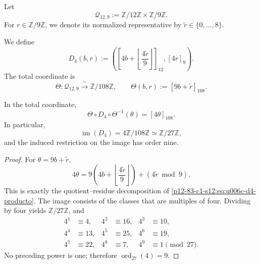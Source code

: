 Let
\[
 \mathcal Q_{12,9}:=
 \mathbb Z/12\mathbb Z\times\mathbb Z/9\mathbb Z.
\]
For \(r\in\mathbb Z/9\mathbb Z\), we denote its normalized representative by
\(\widetilde r\in\{0,\ldots,8\}\).

\begin{definition}
\label{p12-83-c1-s12:def:u006c-dilatacion-registro}
We define
\begin{equation}
 D_4(b,r):=
 \left(
 \left[
  4b+\left\lfloor\frac{4\widetilde r}{9}\right\rfloor
 \right]_{12},
 [4r]_9
 \right).
 \label{p12-83-c1-s12:eq:u006c-d4-producto}
\end{equation}
The total coordinate is
\begin{equation}
 \Theta:\mathcal Q_{12,9}\xrightarrow{\;\sim\;}
 \mathbb Z/108\mathbb Z,
 \qquad
 \Theta(b,r):=[9b+\widetilde r]_{108}.
 \label{p12-83-c1-s12:eq:u006c-coordenada-total}
\end{equation}
\end{definition}

\begin{proposition}
\label{p12-83-c1-s12:prop:u006c-d4-total}
In the total coordinate,
\begin{equation}
 \boxed{
 \Theta\circ D_4\circ\Theta^{-1}(\theta)=[4\theta]_{108}.}
 \label{p12-83-c1-s12:eq:u006c-d4-total}
\end{equation}
In particular,
\begin{equation}
 \operatorname{im}(D_4)
 =4\mathbb Z/108\mathbb Z
 \simeq\mathbb Z/27\mathbb Z,
 \label{p12-83-c1-s12:eq:u006c-imagen-d4}
\end{equation}
and the induced restriction on the image has order nine.
\end{proposition}

\begin{proof}
For \(\theta=9b+\widetilde r\),
\[
 4\theta
 =9\left(
  4b+\left\lfloor\frac{4\widetilde r}{9}\right\rfloor
 \right)
 +(4\widetilde r\bmod9).
\]
This is exactly the quotient--residue decomposition of
\eqref{p12-83-c1-s12:eq:u006c-d4-producto}. The image consists of the classes that are
multiples of four. Dividing by four yields
\(\mathbb Z/27\mathbb Z\), and
\[
\begin{aligned}
 4^1&\equiv4,& 4^2&\equiv16,& 4^3&\equiv10,\\
 4^4&\equiv13,& 4^5&\equiv25,& 4^6&\equiv19,\\
 4^7&\equiv22,& 4^8&\equiv7,& 4^9&\equiv1\pmod{27}.
\end{aligned}
\]
No preceding power is one; therefore
\(\operatorname{ord}_{27}(4)=9\).
\end{proof}

